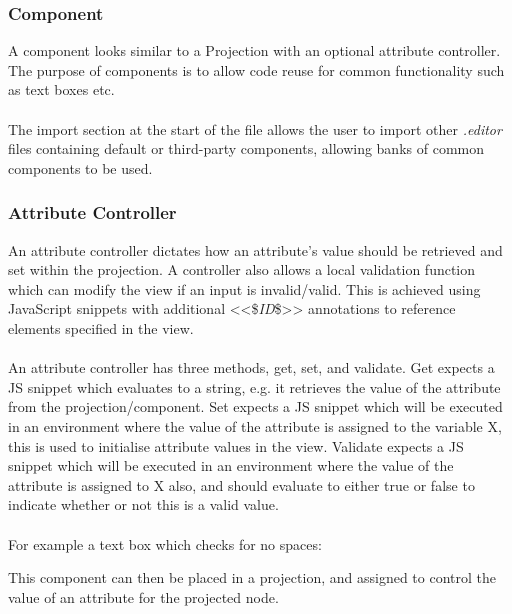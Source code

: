 \documentclass{article}
\begin{document}
{\subsubsection{Component}


A component looks similar to a Projection with an optional attribute controller. The purpose of components is to allow code reuse for common functionality such as text boxes etc.
\\
\\
The import section at the start of the file allows the user to import other \emph{.editor} files containing default or third-party components, allowing banks of common components to be used.

\subsubsection{Attribute Controller}

An attribute controller dictates how an attribute's value should be retrieved and set within the projection. A controller also allows a local validation function which can modify the view if an input is invalid/valid. This is achieved using JavaScript snippets with additional <<\$\emph{ID}\$>> annotations to reference elements specified in the view.
\\
\\
An attribute controller has three methods, get, set, and validate. Get expects a JS snippet which evaluates to a string, e.g. it retrieves the value of the attribute from the projection/component. Set expects a JS snippet which will be executed in an environment where the value of the attribute is assigned to the variable X, this is used to initialise attribute values in the view. Validate expects a JS snippet which will be executed in an environment where the value of the attribute is assigned to X also, and should evaluate to either true or false to indicate whether or not this is a valid value. 
\\
\\
For example a text box which checks for no spaces: 

This component can then be placed in a projection, and assigned to control the value of an attribute for the projected node.

}
\end{document}

